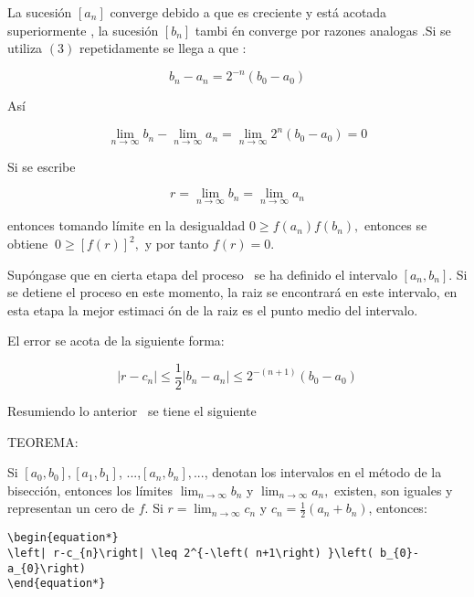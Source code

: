 \documentclass{article}
\begin{document}
La sucesi\'{o}n $\left[ a_{n}\right] $ converge debido a que es creciente y
est\'{a} acotada superiormente , la sucesi\'{o}n $\left[ b_{n}\right] $ tambi%
\'{e}n converge por razones analogas .Si se utiliza $\left( 3\right) $
repetidamente se llega a que :

\begin{equation*}
b_{n}-a_{n}=2^{-n}\left( b_{0}-a_{0}\right) 
\end{equation*}

As\'{i}

\begin{equation*}
\lim_{n\rightarrow \infty }b_{n}-\lim_{n\rightarrow \infty
}a_{n}=\lim_{n\rightarrow \infty }2^{n}\left( b_{0}-a_{0}\right) =0
\end{equation*}

Si se escribe

\begin{equation*}
r=\lim_{n\rightarrow \infty }b_{n}=\lim_{n\rightarrow \infty }a_{n}
\end{equation*}

entonces tomando l\'{i}mite en la desigualdad $0\geqslant f\left(
a_{n}\right) f\left( b_{n}\right) ,$ entonces se obtiene $\ 0\geqslant \left[
f\left( r\right) \right] ^{2},$ y por tanto $f\left( r\right) =0.$

\bigskip 

Sup\'{o}ngase que en cierta etapa del proceso \ se ha definido el intervalo $%
\left[ a_{n},b_{n}\right] .$ Si se detiene el proceso en este momento, la
raiz se encontrar\'{a} en este intervalo, en esta etapa la mejor estimaci%
\'{o}n de la raiz es el punto medio del intervalo.

El error se acota de la siguiente forma:

\begin{equation*}
\left| r-c_{n}\right| \leq \frac{1}{2}\left| b_{n}-a_{n}\right| \leq
2^{-\left( n+1\right) }\left( b_{0}-a_{0}\right) 
\end{equation*}

Resumiendo lo anterior \ se tiene el siguiente 

TEOREMA:

Si $\left[ a_{0},b_{0}\right] ,\left[ a_{1},b_{1}\right] $, ...,$\left[
a_{n},b_{n}\right] ,$..., denotan los intervalos en el m\'{e}todo de la
bisecci\'{o}n, entonces los l\'{i}mites $\lim_{n\rightarrow \infty }b_{n}$ y 
$\lim_{n\rightarrow \infty }a_{n},$ existen, son iguales y representan un
cero de $f.$ Si $r=\lim_{n\rightarrow \infty }c_{n}$ y $c_{n}=\frac{1}{2}%
\left( a_{n}+b_{n}\right) $, entonces:
\begin{verbatim}
\begin{equation*}
\left| r-c_{n}\right| \leq 2^{-\left( n+1\right) }\left( b_{0}-a_{0}\right) 
\end{equation*}
\end{verbatim}
\end{document}
